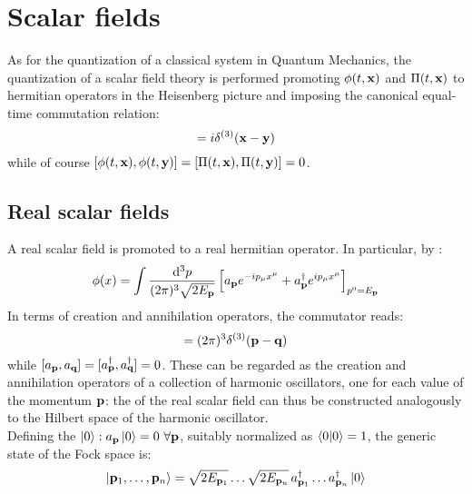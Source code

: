 
\section{Scalar fields}

As for the quantization of a classical system in Quantum Mechanics, the quantization of a scalar field theory is performed promoting $ \phi(t,\mathbf{x}) $ and $ \Pi(t,\mathbf{x}) $ to hermitian operators in the Heisenberg picture and imposing the canonical equal-time commutation relation:
\begin{equation}
  [\phi(t,\ve{x}) , \Pi(t,\ve{y})] = i \delta^{(3)}(\ve{x} - \ve{y})
  \label{eq:scalar-quant-comm}
\end{equation}
while of course $ [\phi(t,\mathbf{x}) , \phi(t,\mathbf{y})] = [\Pi(t,\mathbf{x}) , \Pi(t,\mathbf{y})] = 0 $.

\subsection{Real scalar fields}

A real scalar field is promoted to a real hermitian operator. In particular, by :
\begin{equation}
  \phi(x) = \int \frac{\mathrm{d}^3p}{(2\pi)^3 \sqrt{2E_{\mathbf{p}}}} \left[ a_{\mathbf{p}} e^{-i p_\mu x^\mu} + a_{\mathbf{p}}^\dagger e^{i p_\mu x^\mu} \right]_{p^0 = E_{\mathbf{p}}}
  \label{eq:scalar-quant-exp}
\end{equation}
In terms of creation and annihilation operators, the commutator  reads:
\begin{equation}
  [a_\ve{p} , a_\ve{q}^\dagger] = (2\pi)^3 \delta^{(3)}(\ve{p} - \ve{q})
  \label{eq:scalar-quant-op-comm}
\end{equation}
while $ [a_{\mathbf{p}} , a_{\mathbf{q}}] = [a_{\mathbf{p}}^\dagger , a_{\mathbf{q}}^\dagger] = 0 $. These can be regarded as the creation and annihilation operators of a collection of harmonic oscillators, one for each value of the momentum $ \mathbf{p} $: the  of the real scalar field can thus be constructed analogously to the Hilbert space of the harmonic oscillator.\\
Defining the  $ \ket{0} : a_{\mathbf{p}} \ket{0} = 0 \,\,\forall \mathbf{p} $, suitably normalized as $ \braket{0 | 0} = 1 $, the generic state of the Fock space is:
\begin{equation}
  \ket{\mathbf{p}_1 , \dots , \mathbf{p}_n} = \sqrt{2E_{\mathbf{p}_1}} \dots \sqrt{2E_{\mathbf{p}_n}}\, a_{\mathbf{p}_1}^\dagger \dots a_{\mathbf{p}_n}^\dagger \ket{0}
\end{equation}

